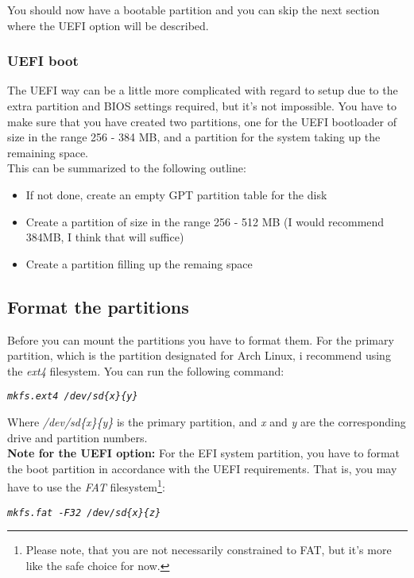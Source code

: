 \documentclass{article}
\newcommand{\code}[1]{\begin{center}
		\textit{\texttt{#1}}
\end{center}}
\begin{document}
 	 You should now have a bootable partition and you can skip the next section where the UEFI option will be described.
 	 \subsubsection{UEFI boot}
 	 
 	 The UEFI way can be a little more complicated with regard to setup due to the extra partition and BIOS settings required, but it's not impossible.  You have to make sure that you have created two partitions, one for the UEFI bootloader of size in the range 256 - 384 MB, and a partition for the system taking up the remaining space. \\
 	 
 	 This can be summarized to the following outline:
 	 
 	 \begin{itemize}
 	 	\item If not done, create an empty GPT partition table for the disk
 	 	\item Create a partition of size in the range 256 - 512 MB (I would recommend 384MB, I think that will suffice)
 	 	\item Create a partition filling up the remaing space
 	 \end{itemize}
  
  \subsection{Format the partitions}
  
  Before you can mount the partitions you have to format them. For the primary partition, which is the partition designated for Arch Linux, i recommend using the \textit{ext4} filesystem. You can run the following command:
  
  \code{mkfs.ext4 /dev/sd\{x\}\{y\}}
  
  Where \textit{/dev/sd\{x\}\{y\}} is the primary partition, and \textit{x} and \textit{y} are the corresponding drive and partition numbers.\\
  
  \textbf{Note for the UEFI option: } For the EFI system partition, you have to format the boot partition in accordance with the UEFI requirements. That is, you may have to use the \textit{FAT} filesystem\footnote{Please note, that you are not necessarily constrained to FAT, but it's more like the safe choice for now.}:
  
  \code{mkfs.fat -F32 /dev/sd\{x\}\{z\}}
  
\end{document}
